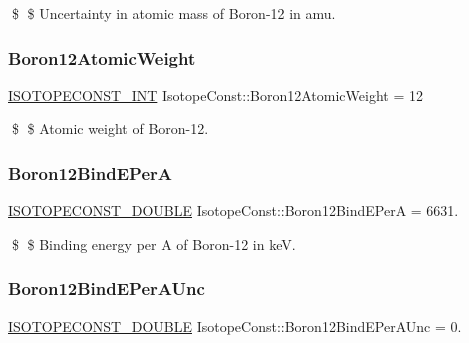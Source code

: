 \$ \$ Uncertainty in atomic mass of Boron-\/12 in amu. \mbox{\label{group___isotope_const-_boron-_b12_ga0fdc71b3ba380d4820aa5954676826e4}} 
\subsubsection{\texorpdfstring{Boron12\+Atomic\+Weight}{Boron12AtomicWeight}}
{\footnotesize\ttfamily \mbox{\hyperlink{group___isotope_const-_macros_ga5f18360b3e99483a35c32d789e62621c}{I\+S\+O\+T\+O\+P\+E\+C\+O\+N\+S\+T\+\_\+\+I\+NT}} Isotope\+Const\+::\+Boron12\+Atomic\+Weight = 12}

\$ \$ Atomic weight of Boron-\/12. \mbox{\label{group___isotope_const-_boron-_b12_gad137cac20843ab816b384e8a85fc3766}} 
\subsubsection{\texorpdfstring{Boron12\+Bind\+E\+PerA}{Boron12BindEPerA}}
{\footnotesize\ttfamily \mbox{\hyperlink{group___isotope_const-_macros_ga8f45a7272ce02c0b4c65c44636ed719a}{I\+S\+O\+T\+O\+P\+E\+C\+O\+N\+S\+T\+\_\+\+D\+O\+U\+B\+LE}} Isotope\+Const\+::\+Boron12\+Bind\+E\+PerA = 6631.}

\$ \$ Binding energy per A of Boron-\/12 in keV. \mbox{\label{group___isotope_const-_boron-_b12_gad79a0d3290406e8c57fd08e73b158a63}} 
\subsubsection{\texorpdfstring{Boron12\+Bind\+E\+Per\+A\+Unc}{Boron12BindEPerAUnc}}
{\footnotesize\ttfamily \mbox{\hyperlink{group___isotope_const-_macros_ga8f45a7272ce02c0b4c65c44636ed719a}{I\+S\+O\+T\+O\+P\+E\+C\+O\+N\+S\+T\+\_\+\+D\+O\+U\+B\+LE}} Isotope\+Const\+::\+Boron12\+Bind\+E\+Per\+A\+Unc = 0.}

